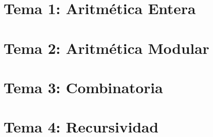 \renewcommand{\contentsname}{Indice}
\tableofcontents
\newpage
\section{Tema 1: Aritmética Entera}

\newpage
\section{Tema 2: Aritmética Modular}

\newpage
\section{Tema 3: Combinatoria}

\newpage
\section{Tema 4: Recursividad}

\newpage
